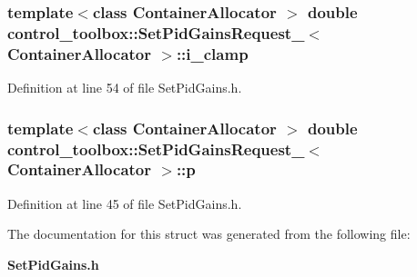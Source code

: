 \subsubsection[{i\-\_\-clamp}]{\setlength{\rightskip}{0pt plus 5cm}template$<$class Container\-Allocator $>$ double {\bf control\-\_\-toolbox\-::\-Set\-Pid\-Gains\-Request\-\_\-}$<$ \-Container\-Allocator $>$\-::{\bf i\-\_\-clamp}}\label{structcontrol__toolbox_1_1SetPidGainsRequest___a9c0f58acea460c2d660025bfaa1b810a}


\-Definition at line 54 of file \-Set\-Pid\-Gains.\-h.

\subsubsection[{p}]{\setlength{\rightskip}{0pt plus 5cm}template$<$class Container\-Allocator $>$ double {\bf control\-\_\-toolbox\-::\-Set\-Pid\-Gains\-Request\-\_\-}$<$ \-Container\-Allocator $>$\-::{\bf p}}\label{structcontrol__toolbox_1_1SetPidGainsRequest___ab4b8f31eda1ad11c8e9276cb28d99544}


\-Definition at line 45 of file \-Set\-Pid\-Gains.\-h.



\-The documentation for this struct was generated from the following file\-:\begin{DoxyCompactItemize}
\item 
{\bf \-Set\-Pid\-Gains.\-h}\end{DoxyCompactItemize}
